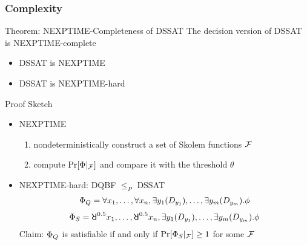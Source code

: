 \begin{frame}
  \frametitle{Complexity}
  \begin{block}{Theorem: NEXPTIME-Completeness of DSSAT}
    The decision version of DSSAT is NEXPTIME-complete
    \pause
    \begin{itemize}
      \item DSSAT is NEXPTIME
            \pause
      \item DSSAT is NEXPTIME-hard
    \end{itemize}
  \end{block}
  \pause
  \begin{block}{Proof Sketch}
    \belowdisplayskip=0pt
    \begin{itemize}
      \item NEXPTIME
            \pause
            \begin{enumerate}
              \item nondeterministically construct a set of Skolem functions $\mathcal{F}$
                    \pause
              \item compute $\Pr[\Phi|_{\mathcal{F}}]$ and compare it with the threshold $\theta$
            \end{enumerate}
            \pause
      \item NEXPTIME-hard: DQBF $\leq_P$ DSSAT
            \pause
            \begin{align*}
              \Phi_Q=\forall x_1, \ldots, \forall x_n, \exists y_1(D_{y_1}), \ldots, \exists y_m(D_{y_m}).\phi
            \end{align*}
            \pause
            \begin{align*}
              \Qf_S=\random{0.5} x_1, \ldots, \random{0.5} x_n, \exists y_1(D_{y_1}), \ldots, \exists y_m(D_{y_m}).\pf
            \end{align*}
            \pause
            Claim: $\Phi_Q$ is satisfiable if and only if $\Pr[\Phi_S|_{\mathcal{F}}] \geq 1$ for some $\mathcal{F}$
    \end{itemize}
  \end{block}
\end{frame}